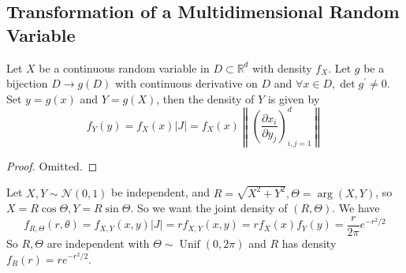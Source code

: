 \subsection{Transformation of a Multidimensional Random Variable}
\begin{theorem}
    Let $X$ be a continuous random variable in $D\subset\mathbb R^d$ with density $f_X$.
    Let $g$ be a bijection $D\to g(D)$ with continuous derivative on $D$ and $\forall x\in D,\det g^\prime\neq 0$.
    Set $y=g(x)$ and $Y=g(X)$, then the density of $Y$ is given by
    $$f_Y(y)=f_X(x)|J|=f_X(x)\left\|\left(\frac{\partial x_i}{\partial y_j}\right)_{i,j=1}^d\right\|$$
\end{theorem}
\begin{proof}
    Omitted.
\end{proof}
\begin{example}
    Let $X,Y\sim\mathcal N(0,1)$ be independent, and $R=\sqrt{X^2+Y^2},\Theta=\arg(X,Y)$, so $X=R\cos\Theta,Y=R\sin\Theta$.
    So we want the joint density of $(R,\Theta)$.
    We have
    $$f_{R,\Theta}(r,\theta)=f_{X,Y}(x,y)|J|=rf_{X,Y}(x,y)=rf_X(x)f_Y(y)=\frac{r}{2\pi}e^{-r^2/2}$$
    So $R,\Theta$ are independent with $\Theta\sim\operatorname{Unif}(0,2\pi)$ and $R$ has density $f_R(r)=re^{-r^2/2}$.
\end{example}
